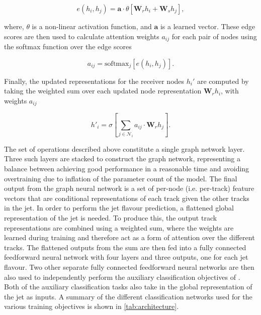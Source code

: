 \begin{equation}\label{eq:edge_score}
    e(h_i, h_j) = \mathbf{a} \cdot \theta \left[ \mathbf{W}_r h_i + \mathbf{W}_s h_j \right],
\end{equation}

where, $\theta$ is a non-linear activation function, and $\mathbf{a}$ is a learned vector.
These edge scores are then used to calculate attention weights $a_{ij}$ for each pair of nodes using the softmax function over the edge scores

\begin{equation}\label{eq:attention weights}
    a_{ij} = \mathrm{softmax}_j \left[ e(h_i, h_j) \right].
\end{equation}

Finally, the updated representations for the receiver nodes $h_i'$ are computed by taking the weighted sum over each updated node representation $\mathbf{W}_r h_i$, with weights $a_{ij}$

\begin{equation}\label{eq:updated_node_rep}
    h'_i = \sigma \left[ \sum_{j \in \mathcal{N}_i}{a_{ij} \cdot \mathbf{W}_r {h}_j}  \right].
\end{equation}

The set of operations described above constitute a single graph network layer. 
Three such layers are stacked to construct the graph network, representing a balance between achieving good performance in a reasonable time and avoiding overtraining due to inflation of the parameter count of the model.
The final output from the graph neural network is a set of per-node (i.e. per-track) feature vectors that are conditional representations of each track given the other tracks in the jet.
In order to perform the jet flavour prediction, a flattened global representation of the jet is needed.
To produce this, the output track representations are combined using a weighted sum, where the weights are learned during training and therefore act as a form of attention over the different tracks.
The flattened outputs from the sum are then fed into a fully connected feedforward neural network with four layers and three outputs, one for each jet flavour.
Two other separate fully connected feedforward neural networks are then also used to independently perform the auxiliary classification objectives of \GNN.
Both of the auxiliary classification tasks also take in the global representation of the jet as inputs.
A summary of the different classification networks used for the various training objectives is shown in \cref{tab:architecture}.


